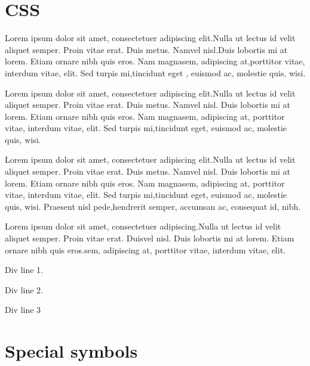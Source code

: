 \documentclass{article}
\begin{document}
\maketitle
\section{CSS}

\par
Lorem ipsum dolor sit amet, consectetuer adipiscing elit.Nulla ut lectus id velit aliquet semper. Proin vitae erat. Duis metus. Namvel nisl.Duis lobortis mi at lorem. Etiam ornare nibh quis eros. Nam magnasem, adipiscing at,porttitor vitae, interdum vitae, elit. Sed turpis mi,tincidunt eget , euismod ac, molestie quis, wisi.

\par
Lorem ipsum dolor sit amet, consectetuer adipiscing elit.Nulla ut lectus id velit aliquet semper. Proin vitae erat. Duis metus. Namvel nisl. Duis lobortis mi at lorem. Etiam ornare nibh quis eros. Nam magnasem, adipiscing at, porttitor vitae, interdum vitae, elit. Sed turpis mi,tincidunt eget, euismod ac, molestie quis, wisi.

\par
Lorem ipsum dolor sit amet, consectetuer adipiscing elit.Nulla ut lectus id velit aliquet semper. Proin vitae erat. Duis metus. Namvel nisl. Duis lobortis mi at lorem. Etiam ornare nibh quis eros. Nam magnasem, adipiscing at, porttitor vitae, interdum vitae, elit. Sed turpis mi,tincidunt eget, euismod ac, molestie quis, wisi. Praesent nisl pede,hendrerit semper, accumsan ac, consequat id, nibh.

\par
Lorem ipsum dolor sit amet, consectetuer adipiscing.Nulla ut lectus id velit aliquet semper. Proin vitae erat. Duisvel nisl. Duis lobortis mi at lorem. Etiam ornare nibh quis eros.sem, adipiscing at, porttitor vitae, interdum vitae, elit.

\par


Div line 1.

Div line 2.

Div line 3

\par

\section{Special symbols}
\end{document}
